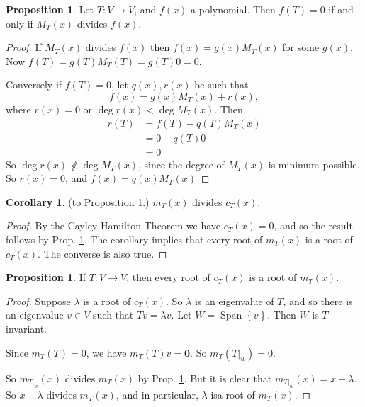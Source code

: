 \documentclass{article}
\theoremstyle{definition} \newtheorem*{definition}{Definition}
\newtheorem{proposition}[theorem]{Proposition}
\newtheorem*{corollary}{Corollary} \newtheorem*{remark}{Remark}
\renewcommand{\vec}[1]{\mathbf{#1}}
\newcommand{\mt}{m_T}
\DeclareMathOperator{\Span}{Span}
\begin{document}
\begin{proposition}
  Let $T:V \rightarrow V$, and $f(x)$ a polynomial. Then $f(T)=0$ if and
  only if $M_T(x)$ divides $f(x)$.
  \label{prp:mdividesf}
\end{proposition}

\begin{proof}
  If $M_T(x)$ divides $f(x)$ then $f(x) =g(x)M_T(x)$ for some $g(x)$.
  Now $f(T)=g(T)M_T(T)=g(T)0=0$.

Conversely if $f(T)=0$, let $q(x),r(x)$ be such that 
$$f(x)=g(x)M_T(x)+r(x),$$ where $r(x)=0$ or $\deg r(x) < \deg M_T(x)$.
Then 
\begin{align*}
r(T)&=f(T)-q(T)M_T(x)\\&=0 - q(T)0\\ &= 0
\end{align*}
So $\deg r(x) \not \nless \deg M_T(x)$, since the degree of $M_T(x)$ is
minimum possible. So $r(x)=0$, and $f(x)=q(x)M_T(x)$
\end{proof}

\begin{corollary}
  (to Proposition \ref{prp:mdividesf}.) $m_T(x)$ divides $c_T(x)$.
\end{corollary}

\begin{proof}
  By the Cayley-Hamilton Theorem we have $c_T(x) =0$, and so the result
  follows by Prop. \ref{prp:mdividesf}. The corollary implies that
  every root of $m_T(x)$ is a root of $c_T(x)$. The converse is also
  true.
\end{proof}

\begin{proposition}
  If $T:V\rightarrow V$, then every root of $c_T(x)$ is a root of 
  $m_T(x)$.
  \label{prp:everyrootcm}
\end{proposition}

\begin{proof}
  Suppose $\lambda$ is a root of $c_T(x)$. So $\lambda$ is an eigenvalue
  of $T$, and so there is an eigenvalue $v \in V$ such that $Tv = \lambda
  v$. Let $W = \Span\left\{ v \right\}$. Then $W$ is $T-$invariant.

  Since $\mt(T)=0$, we  have $\mt(T)v = \vec{0}$. So $\mt(T|_w)=0$.

  So $m_{T|_w}(x)$ divides $\mt(x)$ by Prop. \ref{prp:mdividesf}. But
  it is clear that $m_{T|_w}(x)=x-\lambda$. So $x-\lambda$ divides 
  $\mt(x)$, and in particular, $\lambda$ isa root of $\mt(x)$.
\end{proof}
\end{document}
